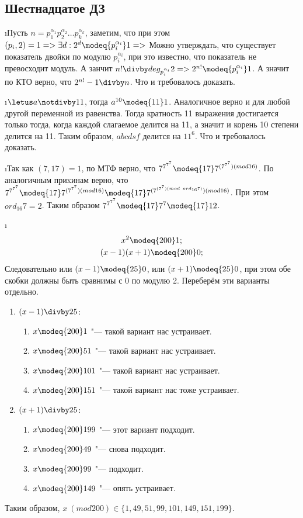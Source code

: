 \subsection{Шестнадцатое ДЗ}


\i Пусть $n = p_1^{\alpha_1}p_2^{\alpha_2}\ldots p_k^{\alpha_k}$, заметим, что при этом $(p_i, 2) = 1 => \exists d: 2^d \modeq{p_i^{\alpha_i}} 1 =>$ Можно утверждать, что существует показатель двойки по модулю $p_i^{\alpha_i}$, при это известно, что показатель не превосходит модуль. А занчит $n! \divby deg_{p_i^{\alpha_i}}2 => 2^{n!} \modeq{p_i^{\alpha_i}} 1$. А значит по КТО верно, что $2^{n!} -1 \divby n$. Что и требовалось доказать.

\i $\letus a \notdivby 11$, тогда $a^{10} \modeq{11} 1$. Аналогичное верно и для любой другой переменной из равенства. Тогда кратность 11 выражения достигается только тогда, когда каждой слагаемое делится на 11, а значит и корень 10 степени делится на 11. Таким образом, $abcdsf$ делится на $11^6$. Что и требовалось доказать.

\i Так как $(7, 17) = 1$, по МТФ верно, что $7^{7^{7^7}} \modeq{17} 7^{(7^{7^{7}})(mod 16)}$. По аналогичным приxинам верно, что $7^{7^{7^7}} \modeq{17} 7^{(7^{7^{7}})(mod 16)} \modeq{17} 7^{(7^{(7^7)(mod\ ord_{16}7)})(mod 16)}$. При этом $ord_{16} 7 = 2$. Таким образом $7^{7^{7^7}} \modeq{17} 7^7 \modeq{17} 12$.

\i
\begin{gather*}
    x^2 \modeq{200} 1;\\
    (x-1)(x+1) \modeq{200} 0;
\end{gather*}
Следовательно или $(x-1) \modeq{25} 0$, или $(x+1) \modeq{25} 0$, при этом обе скобки должны быть сравнимы с 0 по модулю 2. Переберём эти варианты отдельно.
\begin{enumerate}
    \item $(x-1) \divby 25$:
    \begin{enumerate}
        \item $x \modeq{200} 1$ "--- такой вариант нас устраивает.
        \item $x \modeq{200} 51$ "--- такой вариант нас устраивает.
        \item $x \modeq{200} 101$ "--- такой вариант нас устраивает.
        \item $x \modeq{200} 151$ "--- такой вариант нас тоже устраивает.
    \end{enumerate}
    \item $(x+1) \divby 25$:
    \begin{enumerate}
        \item $x \modeq{200} 199$ "--- этот вариант подходит.
        \item $x \modeq{200} 49$ "--- снова подходит.
        \item $x \modeq{200} 99$ "--- подходит.
        \item $x \modeq{200} 149$ "--- опять устраивает.
    \end{enumerate}
\end{enumerate}
Таким образом, $x\ (mod 200) \in \{1, 49, 51, 99, 101, 149, 151, 199\}$.

